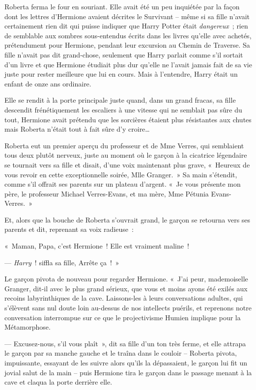 Roberta ferma le four en souriant. Elle avait été un peu inquiétée par la façon dont les lettres d'Hermione avaient décrites le Survivant -- même si sa fille n'avait certainement rien dit qui puisse indiquer que Harry Potter était \emph{dangereux}~; rien de semblable aux sombres sous-entendus écrits dans les livres qu'elle avec achetés, prétendument pour Hermione, pendant leur excursion au Chemin de Traverse. Sa fille n'avait pas dit grand-chose, seulement que Harry parlait comme s'il sortait d'un livre et que Hermione étudiait plus dur qu'elle ne l'avait jamais fait de sa vie juste pour rester meilleure que lui en cours. Mais à l'entendre, Harry était un enfant de onze ans ordinaire.

Elle se rendit à la porte principale juste quand, dans un grand fracas, sa fille descendit frénétiquement les escaliers à une vitesse qui ne semblait pas sûre du tout, Hermione avait prétendu que les sorcières étaient plus résistantes aux chutes mais Roberta n'était tout à fait sûre d'y croire…

Roberta eut un premier aperçu du professeur et de Mme Verres, qui semblaient tous deux plutôt nerveux, juste au moment où le garçon à la cicatrice légendaire se tournait vers sa fille et disait, d'une voix maintenant plus grave, «~Heureux de vous revoir en cette exceptionnelle soirée, Mlle Granger.~» Sa main s'étendit, comme s'il offrait ses parents sur un plateau d'argent. «~Je vous présente mon père, le professeur Michael Verres-Evans, et ma mère, Mme Pétunia Evans-Verres.~»

Et, alors que la bouche de Roberta s'ouvrait grand, le garçon se retourna vers ses parents et dit, reprenant sa voix radieuse~:

«~Maman, Papa, c'est Hermione~! Elle est vraiment maline~!

--- \emph{Harry}~! siffla sa fille, Arrête ça~!~»

Le garçon pivota de nouveau pour regarder Hermione. «~J'ai peur, mademoiselle Granger, dit-il avec le plus grand sérieux, que vous et moins ayons été exilés aux recoins labyrinthiques de la cave. Laissons-les à leurs conversations adultes, qui s'élèvent sans nul doute loin au-dessus de nos intellects puérils, et reprenons notre conversation interrompue sur ce que le projectivisme Humien implique pour la Métamorphose.

--- Excusez-nous, s'il vous plaît~», dit sa fille d'un ton très ferme, et elle attrapa le garçon par sa manche gauche et le traîna dans le couloir -- Roberta pivota, impuissante, essayant de les suivre alors qu'ils la dépassaient, le garçon lui fit un jovial salut de la main -- puis Hermione tira le garçon dans le passage menant à la cave et claqua la porte derrière elle.

